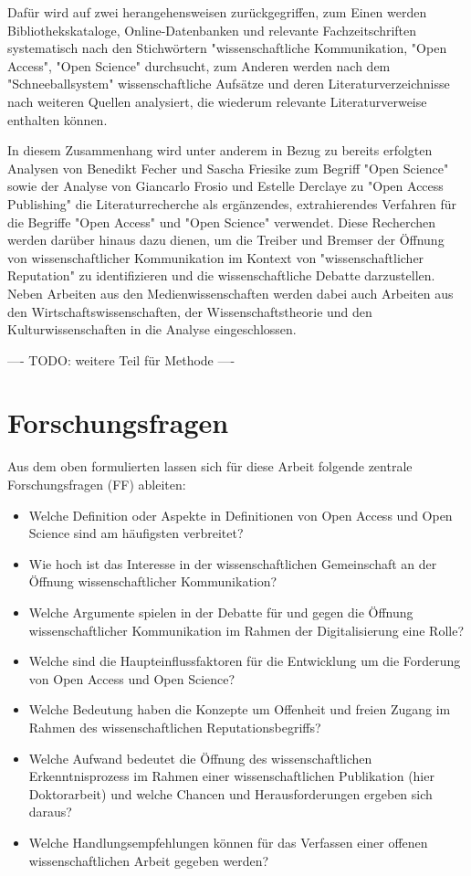 Dafür wird auf zwei herangehensweisen zurückgegriffen, zum Einen werden Bibliothekskataloge,    Online-Datenbanken und relevante Fachzeitschriften systematisch nach den Stichwörtern "wissenschaftliche Kommunikation, "Open Access", "Open Science" durchsucht, zum Anderen werden nach dem "Schneeballsystem" wissenschaftliche Aufsätze und deren Literaturverzeichnisse nach weiteren Quellen analysiert, die wiederum relevante Literaturverweise enthalten können.

In diesem Zusammenhang wird unter anderem in Bezug zu bereits erfolgten Analysen von Benedikt Fecher und Sascha Friesike zum Begriff "Open Science"\cite{cite:9} sowie der Analyse von Giancarlo Frosio und Estelle Derclaye zu "Open Access Publishing" \cite{CREATe_2014} die Literaturrecherche als ergänzendes, extrahierendes Verfahren für die Begriffe "Open Access" und "Open Science" verwendet. Diese Recherchen werden darüber hinaus dazu dienen, um die Treiber und Bremser der Öffnung von wissenschaftlicher Kommunikation im Kontext von "wissenschaftlicher Reputation" zu identifizieren und die wissenschaftliche Debatte darzustellen. Neben Arbeiten aus den Medienwissenschaften werden dabei auch Arbeiten aus den Wirtschaftswissenschaften, der Wissenschaftstheorie und den Kulturwissenschaften in die Analyse eingeschlossen.

---- TODO: weitere Teil für Methode ----


\section{Forschungsfragen}

Aus dem oben formulierten lassen sich für diese Arbeit folgende zentrale Forschungsfragen (FF) ableiten:
\begin{itemize}
\item Welche Definition oder Aspekte in Definitionen von Open Access und Open Science sind am häufigsten verbreitet?
\item Wie hoch ist das Interesse in der wissenschaftlichen Gemeinschaft an der Öffnung wissenschaftlicher Kommunikation?
\item Welche Argumente spielen in der Debatte für und gegen die Öffnung wissenschaftlicher Kommunikation im Rahmen der Digitalisierung eine Rolle?
\item Welche sind die Haupteinflussfaktoren für die Entwicklung um die Forderung von Open Access und Open Science?
\item Welche Bedeutung haben die Konzepte um Offenheit und freien Zugang im Rahmen des wissenschaftlichen Reputationsbegriffs?
\item Welche Aufwand bedeutet die Öffnung des wissenschaftlichen Erkenntnisprozess im Rahmen einer wissenschaftlichen Publikation (hier Doktorarbeit) und welche Chancen und Herausforderungen ergeben sich daraus?
\item Welche Handlungsempfehlungen können für das Verfassen einer offenen wissenschaftlichen Arbeit gegeben werden?
\end{itemize}

